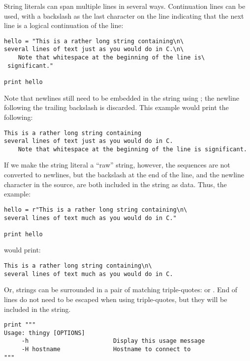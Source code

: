 \documentclass{manual}
\begin{document}
String literals can span multiple lines in several ways.  Continuation
lines can be used, with a backslash as the last character on the line
indicating that the next line is a logical continuation of the line:

\begin{verbatim}
hello = "This is a rather long string containing\n\
several lines of text just as you would do in C.\n\
    Note that whitespace at the beginning of the line is\
 significant."

print hello
\end{verbatim}

Note that newlines still need to be embedded in the string using
\code{\e n}; the newline following the trailing backslash is
discarded.  This example would print the following:

\begin{verbatim}
This is a rather long string containing
several lines of text just as you would do in C.
    Note that whitespace at the beginning of the line is significant.
\end{verbatim}

If we make the string literal a ``raw'' string, however, the
\code{\e n} sequences are not converted to newlines, but the backslash
at the end of the line, and the newline character in the source, are
both included in the string as data.  Thus, the example:

\begin{verbatim}
hello = r"This is a rather long string containing\n\
several lines of text much as you would do in C."

print hello
\end{verbatim}

would print:

\begin{verbatim}
This is a rather long string containing\n\
several lines of text much as you would do in C.
\end{verbatim}

Or, strings can be surrounded in a pair of matching triple-quotes:
\code{"""} or \code{'\code{'}'}.  End of lines do not need to be escaped
when using triple-quotes, but they will be included in the string.

\begin{verbatim}
print """
Usage: thingy [OPTIONS] 
     -h                        Display this usage message
     -H hostname               Hostname to connect to
"""
\end{verbatim}
\end{document}
